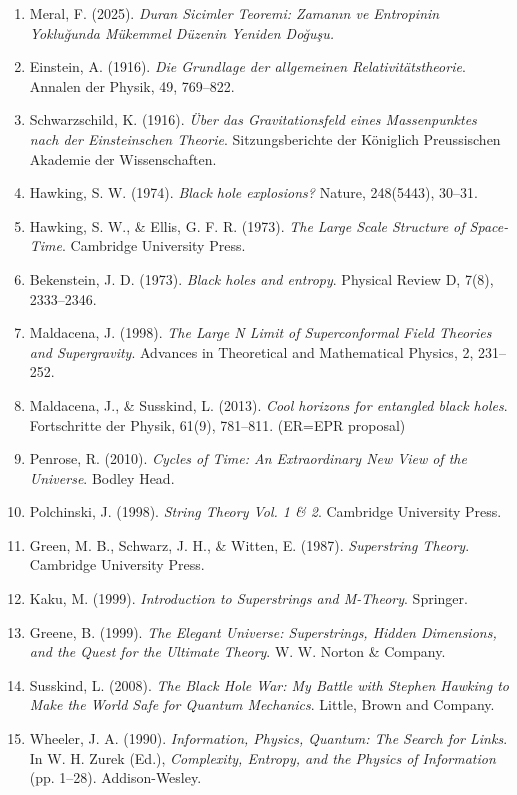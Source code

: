 \documentclass[12pt,a4paper]{article}
\begin{document}
\begin{enumerate}
\item Meral, F. (2025). \textit{Duran Sicimler Teoremi: Zamanın ve Entropinin Yokluğunda Mükemmel Düzenin Yeniden Doğuşu.}
\item Einstein, A. (1916). \textit{Die Grundlage der allgemeinen Relativitätstheorie}. Annalen der Physik, 49, 769–822.
\item Schwarzschild, K. (1916). \textit{\"Uber das Gravitationsfeld eines Massenpunktes nach der Einsteinschen Theorie}. Sitzungsberichte der Königlich Preussischen Akademie der Wissenschaften.
\item Hawking, S. W. (1974). \textit{Black hole explosions?} Nature, 248(5443), 30–31.
\item Hawking, S. W., \& Ellis, G. F. R. (1973). \textit{The Large Scale Structure of Space-Time}. Cambridge University Press.
\item Bekenstein, J. D. (1973). \textit{Black holes and entropy}. Physical Review D, 7(8), 2333–2346.
\item Maldacena, J. (1998). \textit{The Large N Limit of Superconformal Field Theories and Supergravity}. Advances in Theoretical and Mathematical Physics, 2, 231–252.
\item Maldacena, J., \& Susskind, L. (2013). \textit{Cool horizons for entangled black holes}. Fortschritte der Physik, 61(9), 781–811. (ER=EPR proposal)
\item Penrose, R. (2010). \textit{Cycles of Time: An Extraordinary New View of the Universe}. Bodley Head.
\item Polchinski, J. (1998). \textit{String Theory Vol. 1 \& 2}. Cambridge University Press.
\item Green, M. B., Schwarz, J. H., \& Witten, E. (1987). \textit{Superstring Theory}. Cambridge University Press.
\item Kaku, M. (1999). \textit{Introduction to Superstrings and M-Theory}. Springer.
\item Greene, B. (1999). \textit{The Elegant Universe: Superstrings, Hidden Dimensions, and the Quest for the Ultimate Theory}. W. W. Norton \& Company.
\item Susskind, L. (2008). \textit{The Black Hole War: My Battle with Stephen Hawking to Make the World Safe for Quantum Mechanics}. Little, Brown and Company.
\item Wheeler, J. A. (1990). \textit{Information, Physics, Quantum: The Search for Links}. In W. H. Zurek (Ed.), \textit{Complexity, Entropy, and the Physics of Information} (pp. 1–28). Addison-Wesley.

\end{enumerate}
\end{document}
